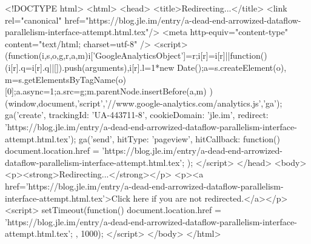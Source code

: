 <!DOCTYPE html>
<html>
<head>
<title>Redirecting...</title>
<link rel="canonical" href="https://blog.jle.im/entry/a-dead-end-arrowized-dataflow-parallelism-interface-attempt.html.tex"/>
<meta http-equiv="content-type" content="text/html; charset=utf-8" />
<script>
(function(i,s,o,g,r,a,m){i['GoogleAnalyticsObject']=r;i[r]=i[r]||function(){
(i[r].q=i[r].q||[]).push(arguments)},i[r].l=1*new Date();a=s.createElement(o),
m=s.getElementsByTagName(o)[0];a.async=1;a.src=g;m.parentNode.insertBefore(a,m)
})(window,document,'script','//www.google-analytics.com/analytics.js','ga');
ga('create', { trackingId: 'UA-443711-8', cookieDomain: 'jle.im', redirect: 'https://blog.jle.im/entry/a-dead-end-arrowized-dataflow-parallelism-interface-attempt.html.tex'});
ga('send', { hitType: 'pageview', hitCallback: function() { document.location.href = 'https://blog.jle.im/entry/a-dead-end-arrowized-dataflow-parallelism-interface-attempt.html.tex'; } });
</script>
</head>
<body>
  <p><strong>Redirecting...</strong></p>
  <p><a href='https://blog.jle.im/entry/a-dead-end-arrowized-dataflow-parallelism-interface-attempt.html.tex'>Click here if you are not redirected.</a></p>
  <script>
    setTimeout(function() { document.location.href = 'https://blog.jle.im/entry/a-dead-end-arrowized-dataflow-parallelism-interface-attempt.html.tex'; }, 1000);
  </script>
</body>
</html>
